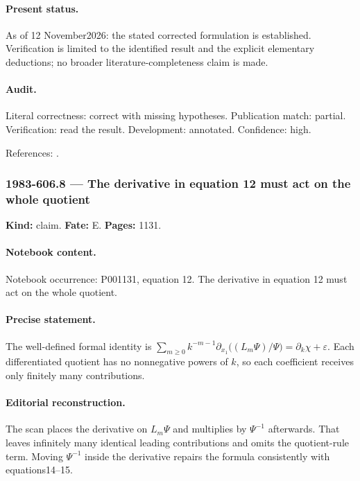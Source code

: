 \paragraph{Present status.} As of 12 November2026: the stated corrected formulation is established. Verification is limited to the identified result and the explicit elementary deductions; no broader literature-completeness claim is made.

\paragraph{Audit.} Literal correctness: correct with missing hypotheses. Publication match: partial. Verification: read the result. Development: annotated. Confidence: high.

\noindent References: \citep{cherednik1978differential}.\par

\subsubsection{1983-606.8 --- The derivative in equation 12 must act on the whole quotient}

\label{item:1983-606.8}

\noindent\textbf{Kind:} claim. \textbf{Fate:} E. \textbf{Pages:} 1131.\par

\paragraph{Notebook content.} Notebook occurrence: P001131, equation 12. The derivative in equation 12 must act on the whole quotient.

\paragraph{Precise statement.} The well-defined formal identity is \(\sum_{m\ge0}k^{-m-1}\partial_{x_1}\bigl((L_m\Psi)/\Psi\bigr)=\partial_k\chi+\varepsilon\). Each differentiated quotient has no nonnegative powers of \(k\), so each coefficient receives only finitely many contributions.

\paragraph{Editorial reconstruction.} The scan places the derivative on \(L_m\Psi\) and multiplies by \(\Psi^{-1}\) afterwards. That leaves infinitely many identical leading contributions and omits the quotient-rule term. Moving \(\Psi^{-1}\) inside the derivative repairs the formula consistently with equations14--15.


